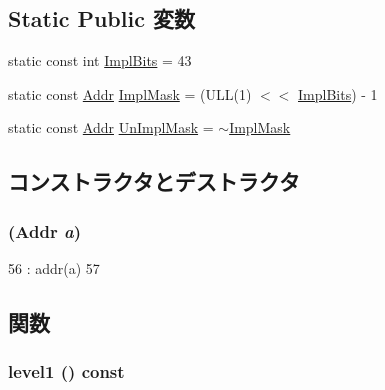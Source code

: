 \subsection*{Static Public 変数}
\begin{DoxyCompactItemize}
\item 
static const int \hyperlink{structPowerISA_1_1VAddr_a90a805e8bf3e59628bdcc4ca67fc68c4}{ImplBits} = 43
\item 
static const \hyperlink{base_2types_8hh_af1bb03d6a4ee096394a6749f0a169232}{Addr} \hyperlink{structPowerISA_1_1VAddr_af9099d6c5264dd55210ff2a90bec4c2e}{ImplMask} = (ULL(1) $<$$<$ \hyperlink{structPowerISA_1_1VAddr_a90a805e8bf3e59628bdcc4ca67fc68c4}{ImplBits}) -\/ 1
\item 
static const \hyperlink{base_2types_8hh_af1bb03d6a4ee096394a6749f0a169232}{Addr} \hyperlink{structPowerISA_1_1VAddr_aea265d87906fd130da86ab5d0977f26a}{UnImplMask} = $\sim$\hyperlink{structPowerISA_1_1VAddr_af9099d6c5264dd55210ff2a90bec4c2e}{ImplMask}
\end{DoxyCompactItemize}


\subsection{コンストラクタとデストラクタ}
\hypertarget{structPowerISA_1_1VAddr_aea4be566b2249d0b69dcee270c8b461d}{
\subsubsection[{VAddr}]{ ({\bf Addr} {\em a})}}
\label{structPowerISA_1_1VAddr_aea4be566b2249d0b69dcee270c8b461d}



\begin{DoxyCode}
56         : addr(a)
57     {}
\end{DoxyCode}


\subsection{関数}
\hypertarget{structPowerISA_1_1VAddr_a6fac2640aa06dbd7e9cf8af5b81f8969}{
\subsubsection[{level1}]{ level1 () const}}
\label{structPowerISA_1_1VAddr_a6fac2640aa06dbd7e9cf8af5b81f8969}



